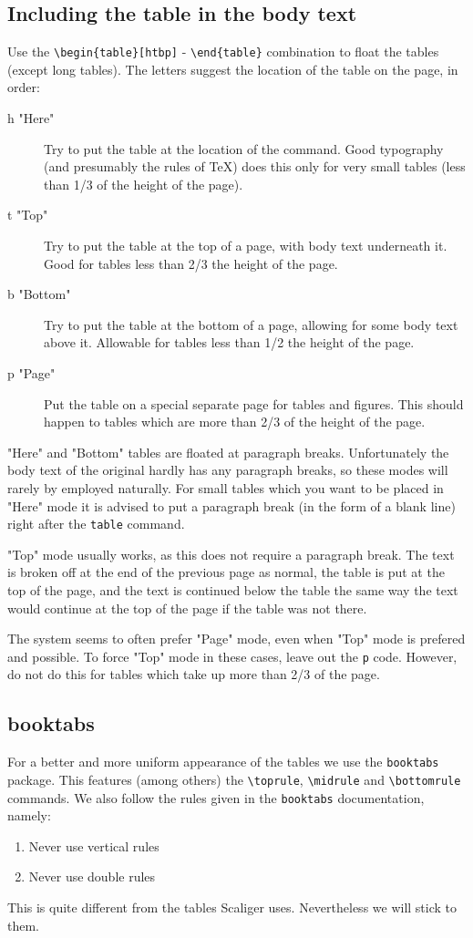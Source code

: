 \documentclass{report}
\begin{document}
\subsection{Including the table in the body text}
Use the \verb+\begin{table}[htbp]+ - \verb+\end{table}+ combination
to float the tables (except long tables).
The letters suggest the location of the table on the page, in order:
\begin{description}
\item[h "Here"] Try to put the table at the location of the command.
Good typography (and presumably the rules of \TeX{}) does this only for very
small tables (less than 1/3 of the height of the page).
\item[t "Top"] Try to put the table at the top of a page, with body text
underneath it.
Good for tables less than 2/3 the height of the page.
\item[b "Bottom"] Try to put the table at the bottom of a page, allowing for
some body text above it.
Allowable for tables less than 1/2 the height of the page.
\item[p "Page"] Put the table on a special separate page for tables and figures.
This should happen to tables which are more than 2/3 of the height of the page.
\end{description}
"Here" and "Bottom"
tables are floated at paragraph breaks.
Unfortunately the body text of the original
hardly has any paragraph breaks,
so these modes will rarely by employed naturally.
For small tables which you want to be placed in "Here" mode
it is advised to put a paragraph break (in the form of a blank line)
right after the \verb+table+ command.

"Top" mode usually works, as this does not require a paragraph break.
The text is broken off at the end of the previous page as normal,
the table is put at the top of the page, and the text is continued
below the table the same way the text would continue at the top of the
page if the table was not there.

The system seems to often prefer "Page" mode, even when "Top" mode is prefered
and possible. To force "Top" mode in these cases, leave out the \verb+p+ code.
However, do not do this for tables which take up more than 2/3 of the page.

\subsection{booktabs}
For a better and more uniform appearance of the tables we use the
\verb+booktabs+ package. This features (among others) the
\verb+\toprule+, \verb+\midrule+ and \verb+\bottomrule+ commands.
We also follow the rules given in the \verb+booktabs+ documentation, namely:
\begin{enumerate}
\item Never use vertical rules
\item Never use double rules
\end{enumerate}
This is quite different from the tables Scaliger uses.
Nevertheless we will stick to them.
\end{document}
